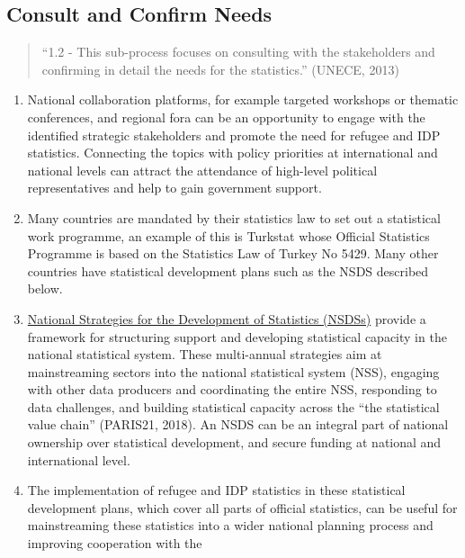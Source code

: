 \documentclass[
]{article}
\begin{document}
\hypertarget{consult-and-confirm-needs-1}{%
\subsection{Consult and Confirm Needs}\label{consult-and-confirm-needs-1}}

\begin{quote}
``1.2 - This sub-process focuses on consulting with the stakeholders
and confirming in detail the needs for the statistics.'' (UNECE, 2013)
\end{quote}

\begin{enumerate}
\def\labelenumi{\arabic{enumi}.}
\setcounter{enumi}{30}
\item
  National collaboration platforms, for example targeted workshops or
  thematic conferences, and regional fora can be an opportunity to
  engage with the identified strategic stakeholders and promote the
  need for refugee and IDP statistics. Connecting the topics with
  policy priorities at international and national levels can attract
  the attendance of high-level political representatives and help to
  gain government support.
\item
  Many countries are mandated by their statistics law to set out a
  statistical work programme, an example of this is Turkstat whose
  Official Statistics Programme is based on the Statistics Law of
  Turkey No 5429. Many other countries have statistical development
  plans such as the NSDS described below.
\item
  \href{https://nsdsguidelines.paris21.org/node/717}{National Strategies for the Development of Statistics
  (NSDSs)} provide a
  framework for structuring support and developing statistical
  capacity in the national statistical system. These multi-annual
  strategies aim at mainstreaming sectors into the national
  statistical system (NSS), engaging with other data producers and
  coordinating the entire NSS, responding to data challenges, and
  building statistical capacity across the ``the statistical value
  chain'' (PARIS21, 2018). An NSDS can be an integral part of national
  ownership over statistical development, and secure funding at
  national and international level.
\item
  The implementation of refugee and IDP statistics in these
  statistical development plans, which cover all parts of official
  statistics, can be useful for mainstreaming these statistics into a
  wider national planning process and improving cooperation with the

\end{enumerate}
\end{document}
